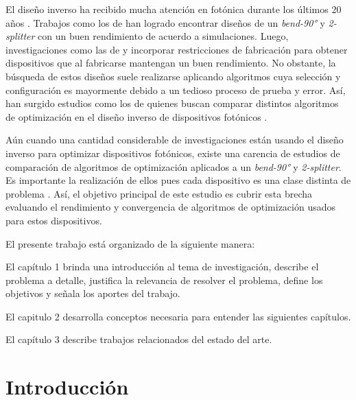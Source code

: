 El diseño inverso ha recibido mucha atención en fotónica durante los últimos 20 años \citep{Molesky2018}. 
Trabajos como los de  \cite{Su2020} han logrado encontrar diseños de un \emph{bend-90°} y \emph{2-splitter} con un buen rendimiento  de acuerdo a simulaciones.
Luego, investigaciones como las de \cite{Su2018} y \cite{Piggott2017}  incorporar restricciones de fabricación para obtener dispositivos que al fabricarse mantengan un buen rendimiento. 
No obstante, la búsqueda de estos diseños suele realizarse aplicando algoritmos cuya selección y configuración es mayormente debido a un tedioso proceso de prueba y error.
Así, han surgido estudios como los de \cite{Schneider2019, Elsawy2020, Gregory2015} quienes buscan comparar distintos algoritmos de optimización en el diseño inverso de dispositivos fotónicos .


Aún cuando una cantidad considerable  de investigaciones están usando el diseño inverso para optimizar dispositivos fotónicos, existe una carencia de estudios de comparación de algoritmos de optimización aplicados a un \emph{bend-90°} y \emph{2-splitter}. 
Es importante la realización de ellos pues cada dispositivo es una clase distinta de problema \citep{Molesky2018}. 
Así, el objetivo principal de este estudio es cubrir esta brecha evaluando el rendimiento y convergencia de algoritmos de optimización usados para estos dispositivos.

El presente trabajo está organizado de la siguiente manera:

El capítulo 1 brinda una introducción al tema de investigación, describe el problema a detalle, justifica la relevancia de resolver el problema, define los objetivos y señala los aportes del trabajo.

El capitulo 2 desarrolla conceptos   necesaria para entender las siguientes capítulos.

El capítulo 3 describe trabajos relacionados del estado del arte.

\section{Introducción}

